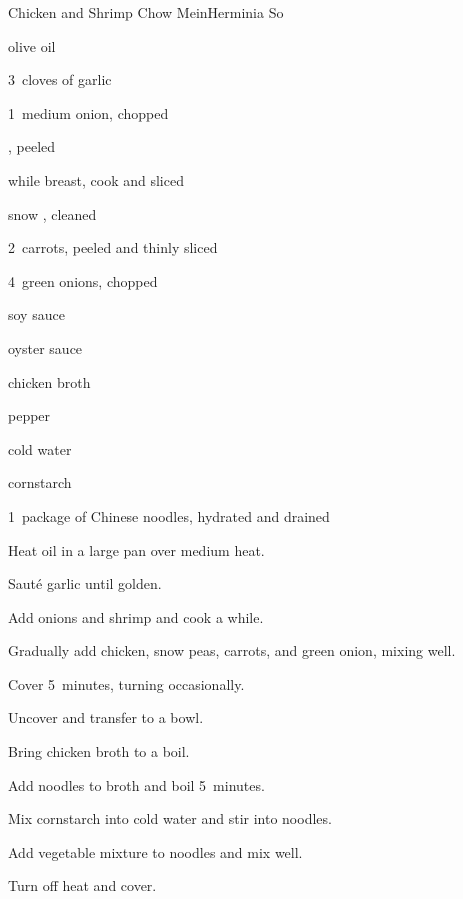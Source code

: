 \begin{recipe}{Chicken and Shrimp Chow Mein}{Herminia So}{}

\begin{ingredients}
\item \C{\quarter} olive oil
\item 3~cloves of garlic
\item 1~medium onion, chopped
\item {} , peeled
\item while  breast, cook and sliced
\item {} snow , cleaned
\item 2~carrots, peeled and thinly sliced
\item 4~green onions, chopped
\item {} soy sauce
\item {} oyster sauce
\item {} chicken broth
\item \tp{\half} pepper
\item \Tp{1\half} cold water
\item {} cornstarch
\item 1~package of Chinese noodles, hydrated and drained
\end{ingredients}

\begin{directions}
\item Heat oil in a large pan over medium heat.
\item Saut\'e garlic until golden.
\item Add onions and shrimp and cook a while.
\item Gradually add chicken, snow peas, carrots, and green onion, mixing well.
\item Cover 5~minutes, turning occasionally.
\item Uncover and transfer to a bowl.
\item Bring chicken broth to a boil.
\item Add noodles to broth and boil 5~minutes.
\item Mix cornstarch into cold water and stir into noodles.
\item Add vegetable mixture to noodles and mix well.
\item Turn off heat and cover.
\end{directions}

\end{recipe}
